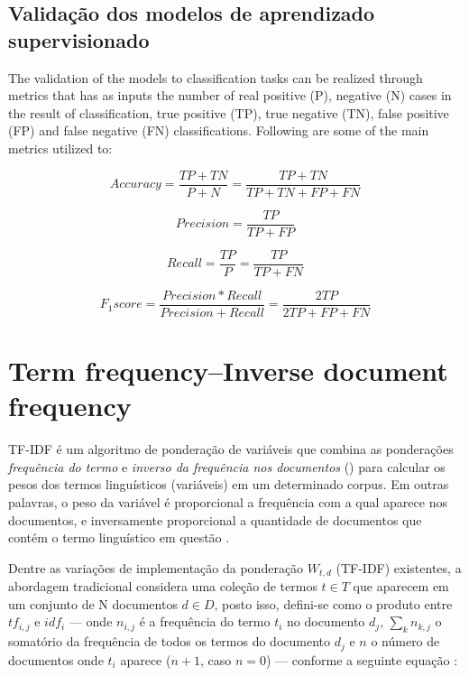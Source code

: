 \documentclass[
	12pt,				%
	oneside,			%
	a4paper,			%
	english,			%
	brazil				%
	]{abntex2ppgsi}
\begin{document}


\subsection{Validação dos modelos de aprendizado supervisionado}
\label{modelValidation}

The validation of the models to classification tasks can be realized through metrics that has as inputs the number of real positive (P), negative (N) cases in the result of classification, true positive (TP), true negative (TN), false positive (FP) and false negative (FN) classifications. Following are some of the main metrics utilized to:

\begin{equation}
Accuracy = \frac{TP + TN}{P + N} = \frac{TP + TN}{TP + TN + FP + FN}
\end{equation}

\begin{equation}
Precision = \frac{TP}{TP + FP}
\end{equation}

\begin{equation}
Recall = \frac{TP}{P} = \frac{TP}{TP + FN}
\end{equation}

\begin{equation}
F_1 score = \frac{Precision * Recall}{Precision + Recall} = \frac{2TP}{2TP + FP + FN}
\end{equation}

\section{Term frequency–Inverse document frequency}

TF-IDF é um algoritmo de ponderação de variáveis que combina as ponderações \emph{frequência do termo}  e \emph{inverso da frequência nos documentos} () para calcular os pesos dos termos linguísticos (variáveis) em um determinado corpus. Em outras palavras, o peso da variável é proporcional a frequência com a qual aparece nos documentos, e inversamente proporcional a quantidade de documentos que contém o termo linguístico em questão \cite{wu2018improved, yahav2018comments}. 


Dentre as variações de implementação da ponderação $W_{t,d}$ (TF-IDF) existentes, a abordagem tradicional considera uma coleção de termos $t \in T$ que aparecem em um conjunto de N documentos $d \in D$, posto isso, defini-se como o produto entre $tf_{i,j}$ e $idf_i$ --- onde $n_{i,j}$ é a frequência do termo $t_i$ no documento $d_j$, $\sum_k n_{k,j}$ o somatório da frequência de todos os termos do documento $d_j$ e $n$ o número de documentos onde $t_i$ aparece ($n + 1$, caso $n = 0$) --- conforme a seguinte equação \cite{wu2018improved}:
\end{document}
